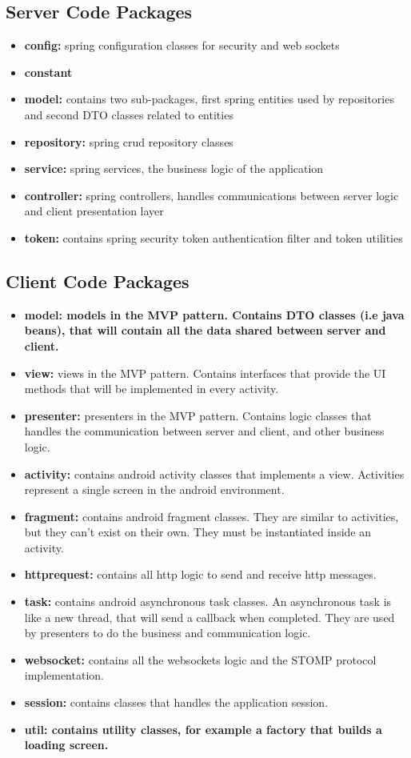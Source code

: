 \documentclass[a4paper]{article}
\begin{document}
\subsection{Server Code Packages}
\begin{itemize}
\item \textbf{config:} spring configuration classes for security and web sockets
\item \textbf{constant}
\item \textbf{model:} contains two sub-packages, first spring entities used by repositories and second DTO classes related to entities
\item \textbf{repository:} spring crud repository classes
\item \textbf{service:} spring services, the business logic of the application
\item \textbf{controller:} spring controllers, handles communications between server logic and client presentation layer
\item \textbf{token:} contains spring security token authentication filter and token utilities
\end{itemize}

\subsection{Client Code Packages}
\begin{itemize}
\item \textbf{model: models in the MVP pattern. Contains DTO classes (i.e java beans), that will contain all the data shared between server and client.}
\item \textbf{view:} views in the MVP pattern. Contains interfaces that provide the UI methods that will be implemented in every activity.
\item \textbf{presenter:} presenters in the MVP pattern. Contains logic classes that handles the communication between server and client, and other business logic.
\item \textbf{activity:} contains android activity classes that implements a view. Activities represent a single screen in the android environment.
\item \textbf{fragment:} contains android fragment classes. They are similar to activities, but they can't exist on their own. They must be instantiated inside an activity.
\item \textbf{httprequest:} contains all http logic to send and receive http messages.
\item \textbf{task:} contains android asynchronous task classes. An asynchronous task is like a new thread, that will send a callback when completed. They are used by presenters to do the business and communication logic.
\item \textbf{websocket:} contains all the websockets logic and the STOMP protocol implementation.
\item \textbf{session:} contains classes that handles the application session.
\item \textbf{util: contains utility classes, for example a factory that builds a loading screen.}
\end{itemize}
\end{document}
